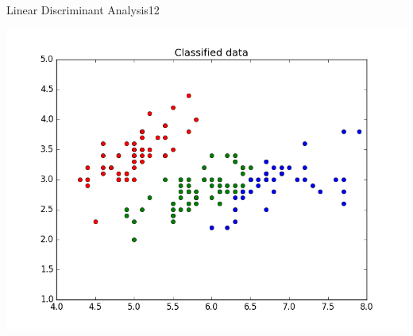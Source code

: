 \begin{questions}
\begin{question}{Linear Discriminant Analysis}{12}
\begin{answer}
	\centering\includegraphics[width=0.7\linewidth]{./img/32b2.png}
	
	
	
\end{answer}
\end{question}


\end{questions}
